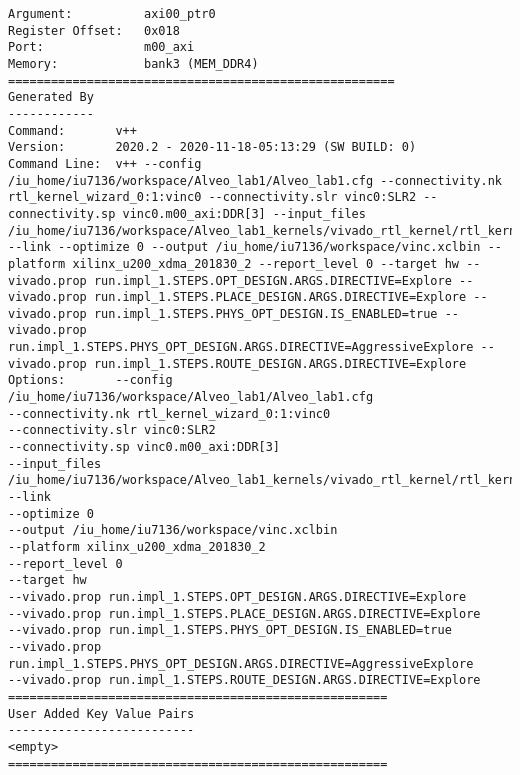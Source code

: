 \begin{lstlisting}[label=lst:code_3,caption=Содержимое файла  vinc\_xclbin\_info]
Argument:          axi00_ptr0
Register Offset:   0x018
Port:              m00_axi
Memory:            bank3 (MEM_DDR4)
======================================================
Generated By
------------
Command:       v++
Version:       2020.2 - 2020-11-18-05:13:29 (SW BUILD: 0)
Command Line:  v++ --config /iu_home/iu7136/workspace/Alveo_lab1/Alveo_lab1.cfg --connectivity.nk rtl_kernel_wizard_0:1:vinc0 --connectivity.slr vinc0:SLR2 --connectivity.sp vinc0.m00_axi:DDR[3] --input_files /iu_home/iu7136/workspace/Alveo_lab1_kernels/vivado_rtl_kernel/rtl_kernel_wizard_0_ex/exports/rtl_kernel_wizard_0.xo --link --optimize 0 --output /iu_home/iu7136/workspace/vinc.xclbin --platform xilinx_u200_xdma_201830_2 --report_level 0 --target hw --vivado.prop run.impl_1.STEPS.OPT_DESIGN.ARGS.DIRECTIVE=Explore --vivado.prop run.impl_1.STEPS.PLACE_DESIGN.ARGS.DIRECTIVE=Explore --vivado.prop run.impl_1.STEPS.PHYS_OPT_DESIGN.IS_ENABLED=true --vivado.prop run.impl_1.STEPS.PHYS_OPT_DESIGN.ARGS.DIRECTIVE=AggressiveExplore --vivado.prop run.impl_1.STEPS.ROUTE_DESIGN.ARGS.DIRECTIVE=Explore 
Options:       --config /iu_home/iu7136/workspace/Alveo_lab1/Alveo_lab1.cfg
--connectivity.nk rtl_kernel_wizard_0:1:vinc0
--connectivity.slr vinc0:SLR2
--connectivity.sp vinc0.m00_axi:DDR[3]
--input_files /iu_home/iu7136/workspace/Alveo_lab1_kernels/vivado_rtl_kernel/rtl_kernel_wizard_0_ex/exports/rtl_kernel_wizard_0.xo
--link
--optimize 0
--output /iu_home/iu7136/workspace/vinc.xclbin
--platform xilinx_u200_xdma_201830_2
--report_level 0
--target hw
--vivado.prop run.impl_1.STEPS.OPT_DESIGN.ARGS.DIRECTIVE=Explore
--vivado.prop run.impl_1.STEPS.PLACE_DESIGN.ARGS.DIRECTIVE=Explore
--vivado.prop run.impl_1.STEPS.PHYS_OPT_DESIGN.IS_ENABLED=true
--vivado.prop run.impl_1.STEPS.PHYS_OPT_DESIGN.ARGS.DIRECTIVE=AggressiveExplore
--vivado.prop run.impl_1.STEPS.ROUTE_DESIGN.ARGS.DIRECTIVE=Explore 
=====================================================
User Added Key Value Pairs
--------------------------
<empty>
=====================================================
\end{lstlisting}